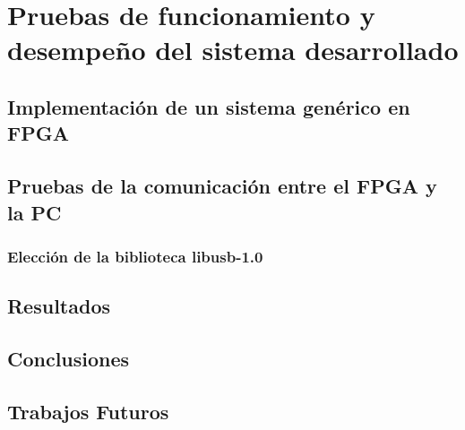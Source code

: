\chapter{Pruebas de funcionamiento y desempeño del sistema desarrollado}
	\label{cap:verif}
	
%		
	\section{Implementación de un sistema genérico en FPGA}
		
	\section{Pruebas de la comunicación entre el FPGA y la PC}
		\subsection{Elección de la biblioteca libusb-1.0}
		
		
	\section{Resultados}
		
	\section{Conclusiones}
		
	\section{Trabajos Futuros}
		